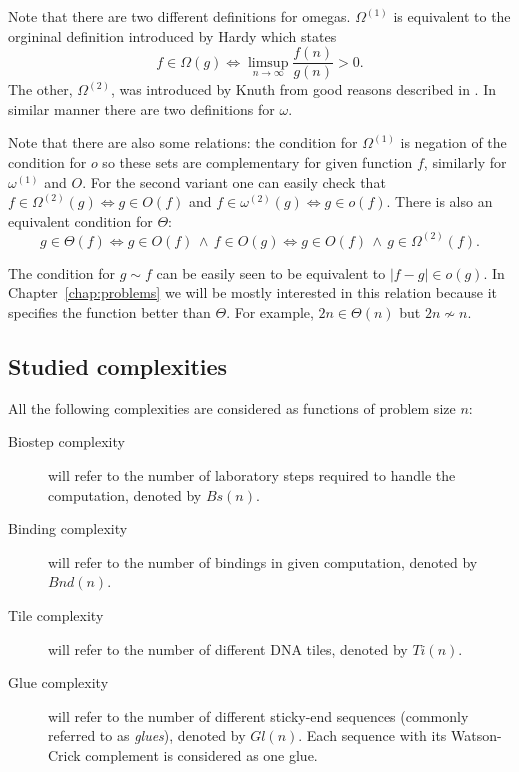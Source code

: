 		\begin{remark}
			Note that there are two different definitions for omegas. $\Omega^{(1)}$ is equivalent to the orgininal definition introduced by Hardy \cite{hardy1914} which states
			\begin{equation*}
				f \in \Omega(g) \iff \limsup\limits_{n\to\infty}\frac{f(n)}{g(n)} > 0 .
			\end{equation*}
			The other, $\Omega^{(2)}$, was introduced by Knuth from good reasons described in \cite{knuth76}. In similar manner there are two definitions for $\omega$.
			
			Note that there are also some relations: the condition for $\Omega^{(1)}$ is negation of the condition for $o$ so these sets are complementary for given function $f$, similarly for $\omega^{(1)}$ and $O$. For the second variant one can easily check that $f\in\Omega^{(2)}(g)\iff g\in O(f)$ and $f\in\omega^{(2)}(g)\iff g\in o(f)$. There is also an equivalent condition for $\Theta$:
			\begin{equation*}
				g \in \Theta(f) \iff g \in O(f) \,\wedge\, f \in O(g) \iff g \in O(f) \,\wedge\, g \in \Omega^{(2)}(f) .
			\end{equation*}
			
			The condition for $g \sim f$ can be easily seen to be equivalent to $|f-g| \in o(g)$. In Chapter~\ref{chap:problems} we will be mostly interested in this relation because it specifies the function better than $\Theta$. For example, $2n \in \Theta(n)$ but $2n \not\sim n$.
		\end{remark}
	
	\subsection{Studied complexities}
		
		\begin{defn}
			All the following complexities are considered as functions of problem size $n$:
			\begin{description}
				\item[Biostep complexity] will refer to the number of laboratory steps required to handle the computation, denoted by $Bs(n)$.
				\item[Binding complexity] will refer to the number of bindings in given computation, denoted by $Bnd(n)$.
				\item[Tile complexity] will refer to the number of different DNA tiles, denoted by $Ti(n)$.
				\item[Glue complexity] will refer to the number of different sticky-end sequences (commonly referred to as {\em glues}), denoted by $Gl(n)$. Each sequence with its Watson-Crick complement is considered as one glue.
			\end{description}
		\end{defn}
		
